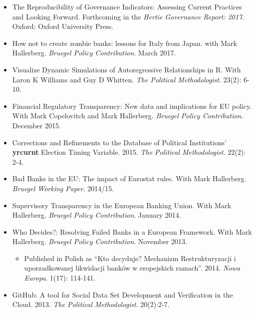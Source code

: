 \documentclass[a4paper]{article}
\begin{document}
\begin{itemize}

    \item The Reproducibility of Governance Indicators: Assessing Current Practices and Looking Forward. Forthcoming in the \emph{Hertie Governance Report: 2017}. Oxford: Oxford University Press.

    \item How not to create zombie banks: lessons for Italy from Japan. with Mark Hallerberg. \emph{Bruegel Policy Contribution}. March 2017.

    \item Visualize Dynamic Simulations of Autoregressive Relationships in R. With Laron K Williams and Guy D Whitten. \emph{The Political Methodologist}. 23(2): 6-10.

    \item Financial Regulatory Transparency: New data and implications for EU policy. With Mark Copelovitch and Mark Hallerberg. \emph{Bruegel Policy Contribution}. December 2015.

    \item Corrections and Refinements to the Database of Political Institutions' \textbf{yrcurnt} Election Timing Variable. 2015. {\emph{The Political Methodologist}}. 22(2): 2-4.

    \item Bad Banks in the EU: The impact of Eurostat rules. With Mark Hallerberg. \emph{Bruegel Working Paper}. 2014/15.

    \item Supervisory Transparency in the European Banking Union. With Mark Hallerberg. {\emph{Bruegel Policy Contribution}}. January 2014.

    \item Who Decides?: Resolving Failed Banks in a European Framework. With Mark Hallerberg. {\emph{Bruegel Policy Contribution}}. November 2013.

      \begin{itemize}
        \item Published in Polish as ``Kto decyduje? Mechanizm Restrukturyzacji i uporzadkowanej likwidacji bank\'{o}w w eropejskich ramach''. 2014. \emph{Nowa Europa}. 1(17): 114-141.
      \end{itemize}

    \item GitHub: A tool for Social Data Set Development and Verification in the Cloud. 2013. {\emph{The Political Methodologist}}. 20(2):2-7.

\end{itemize}
\end{document}
